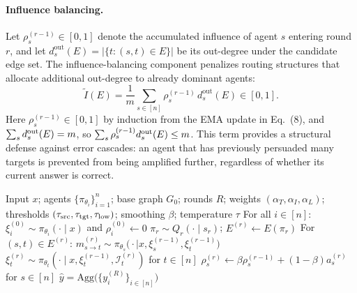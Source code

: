  
\paragraph{Influence balancing.}
Let $\rho_s^{(r-1)}\in[0,1]$ denote the accumulated influence of agent $s$ entering round $r$, and let $d^{\mathrm{out}}_s(E)=|\{t:(s,t)\in E\}|$ be its out-degree under the candidate edge set. The influence-balancing component penalizes routing structures that allocate additional out-degree to already dominant agents:
\begin{equation}
        \widetilde{I}(E)=\frac{1}{m}\sum_{s\in[n]}\rho_s^{(r-1)}\,d^{\mathrm{out}}_s(E)\in[0,1].
    \label{eq:influence-balancing}
\end{equation}
Here $\rho_s^{(r-1)}\in[0,1]$ by induction from the EMA update in
Eq.~(8), and $\sum_s d_s^{\rm out}(E)=m$, so
$\sum_s \rho_s^{(r-1)}d_s^{\rm out}(E)\le m$.
This term provides a structural defense against error cascades: an agent that has previously persuaded many targets is prevented from being amplified further, regardless of whether its current answer is correct.

\algrenewcommand\algorithmicindent{1em}

\begin{algorithm}[t]
\caption{PEAR}%
\label{alg:armad}
\begin{algorithmic}[1]
\small
\Require Input $x$; agents $\{\pi_{\theta_i}\}_{i=1}^n$; base graph
$G_0$; rounds $R$; weights $(\alpha_T,\alpha_I,\alpha_L)$; thresholds
$(\tau_{\rm src},\tau_{\rm tgt},\tau_{\rm low})$; smoothing $\beta$;
temperature $\tau$
\State For all $i\in[n]$: $\xi_i^{(0)}\!\sim\!\pi_{\theta_i}(\cdot\mid x)$ and $\rho_i^{(0)}\!\leftarrow\!0$ 
\State $\pi_r \sim Q_r(\cdot\mid s_r)$; $E^{(r)}\leftarrow E(\pi_r)$
\State {}
    \State For $(s,t)\!\in\! E^{(r)}$: $m_{s\to t}^{(r)} \sim \pi_{\theta_s}\big(\cdot \mid x,\xi_s^{(r-1)},\xi_t^{(r-1)}\big)$
    \State \hfill{}
    \State $\xi_t^{(r)}\!\sim\!\pi_{\theta_t}(\cdot\mid x,\xi_t^{(r-1)},\mathcal{I}_t^{(r)})$ for $t\in[n]$ 
    \hfill{}
    \State $\rho_s^{(r)}\!\leftarrow\!\beta\rho_s^{(r-1)}\!+\!(1\!-\!\beta)a_s^{(r)}$ for $s\in[n]$ \hfill{}
\EndFor
\State \Return $\hat{y}=\mathrm{Agg}\big(\{y_i^{(R)}\}_{i\in[n]}\big)$
\end{algorithmic}
\end{algorithm}
 
